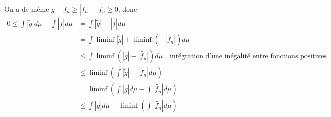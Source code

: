 \documentclass{report}
\begin{document}
On a de même $g-\widetilde{f_n}\geq |\widetilde{f_n}| -\widetilde{f_n} \geq 0$, donc 
$$\begin{aligned} 0 \leq  \int |\widetilde{g}| d\mu - \int |\widetilde{f}| d\mu 
&=  \int |\widetilde{g}| -  |\widetilde{f}| d\mu \\
&= \int \liminf|\widetilde{g}| + \liminf \left(-|\widetilde{f_n}|\right)  d\mu\\
&\leq \int \liminf \left( |\widetilde{g}| -  |\widetilde{f_n}| \right)d\mu \quad \text{intégration d'une inégalité entre fonctions positives}  \\
&\leq \liminf\left(  \int |\widetilde{g}| -  |\widetilde{f_n}| d\mu \right) \\
&= \liminf\left(  \int |\widetilde{g}| d\mu  -  \int |\widetilde{f_n}| d\mu \right) \\
&\leq \int |\widetilde{g}| d\mu + \liminf \left( \int  |\widetilde{f_n}| d\mu\right)
\end{aligned}$$
\end{document}
